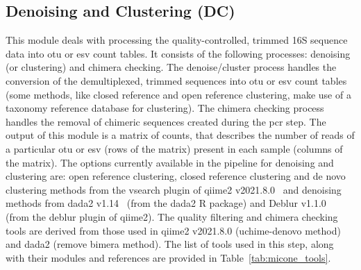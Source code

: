   \subsection*{Denoising and Clustering (DC)}
  \vspace{-5mm}
  This module deals with processing the quality-controlled, trimmed 16S sequence data into \ac{otu} or \ac{esv} count tables.
  It consists of the following processes: denoising (or clustering) and chimera checking.
  The denoise/cluster process handles the conversion of the demultiplexed, trimmed sequences into \ac{otu} or \ac{esv} count tables (some methods, like closed reference and open reference clustering, make use of a taxonomy reference database for clustering).
  The chimera checking process handles the removal of chimeric sequences created during the \ac{pcr} step.
  The output of this module is a matrix of counts, that describes the number of reads of a particular \ac{otu} or \ac{esv} (rows of the matrix) present in each sample (columns of the matrix).
  The options currently available in the pipeline for denoising and clustering are: open reference clustering, closed reference clustering and de novo clustering methods from the vsearch plugin of \ac{qiime2} v2021.8.0~\cite{bolyenReproducibleInteractiveScalable2019} and denoising methods from \ac{dada2} v1.14~\cite{Callahan2016} (from the \ac{dada2} R package) and Deblur v1.1.0~\cite{Amir2017} (from the deblur plugin of \ac{qiime2}).
  The quality filtering and chimera checking tools are derived from those used in \ac{qiime2} v2021.8.0 (uchime-denovo method) and \ac{dada2} (remove bimera method).
  The list of tools used in this step, along with their modules and references are provided in Table~\ref{tab:micone_tools}.

